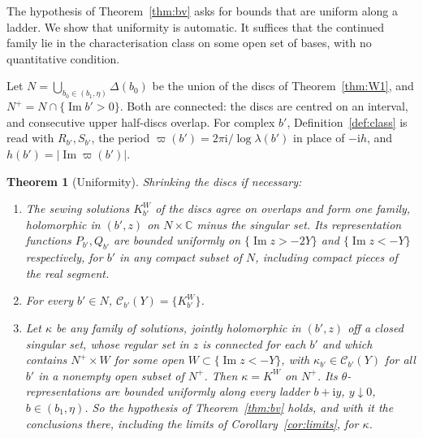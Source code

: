 \documentclass[11pt]{amsart}
\newtheorem{theorem}{Theorem}[section]
\theoremstyle{definition}
\newcommand{\Rr}{R}
\newcommand{\Kk}{K}
\newcommand{\ii}{\mathrm{i}}
\begin{document}
The hypothesis of Theorem~\ref{thm:bv} asks for bounds that are uniform along
a ladder.  We show that uniformity is automatic.  It suffices that the
continued family lie in the characterisation class on some open set of bases,
with no quantitative condition.

Let $N=\bigcup_{b_0\in(b_1,\eta)}\Delta(b_0)$ be the union of the discs of
Theorem~\ref{thm:W1}, and $N^+=N\cap\{\operatorname{Im}b'>0\}$.  Both are
connected: the discs are centred on an interval, and consecutive upper
half-discs overlap.  For complex $b'$, Definition~\ref{def:class} is read with
$\Rr_{b'},S_{b'}$, the period $\varpi(b')=2\pi\ii/\log\lambda(b')$ in place of
$-\ii h$, and $h(b')=|\operatorname{Im}\varpi(b')|$.

\begin{theorem}[Uniformity]\label{thm:unif}
Shrinking the discs if necessary:
\begin{enumerate}
\item The sewing solutions $\Kk^W_{b'}$ of the discs agree on overlaps and form
  one family, holomorphic in $(b',z)$ on $N\times\mathbb C$ minus the singular
  set.  Its representation functions $P_{b'},Q_{b'}$ are bounded uniformly on
  $\{\operatorname{Im}z>-2Y\}$ and $\{\operatorname{Im}z<-Y\}$ respectively,
  for $b'$ in any compact subset of $N$, including compact pieces of the real
  segment.
\item For every $b'\in N$, $\mathcal C_{b'}(Y)=\{\Kk^W_{b'}\}$.
\item Let $\kappa$ be any family of solutions, jointly holomorphic in $(b',z)$
  off a closed singular set, whose regular set in $z$ is connected for each
  $b'$ and which contains $N^+\times W$ for some open
  $W\subset\{\operatorname{Im}z<-Y\}$, with $\kappa_{b'}\in\mathcal C_{b'}(Y)$ for all $b'$ in a nonempty open
  subset of $N^+$.  Then $\kappa=\Kk^W$ on $N^+$.  Its
  $\theta$-representations are bounded uniformly along every ladder
  $b+\ii y$, $y\downarrow0$, $b\in(b_1,\eta)$.  So the hypothesis of
  Theorem~\ref{thm:bv} holds, and with it the conclusions there, including
  the limits of Corollary~\ref{cor:limits}, for $\kappa$.
\end{enumerate}
\end{theorem}
\end{document}
